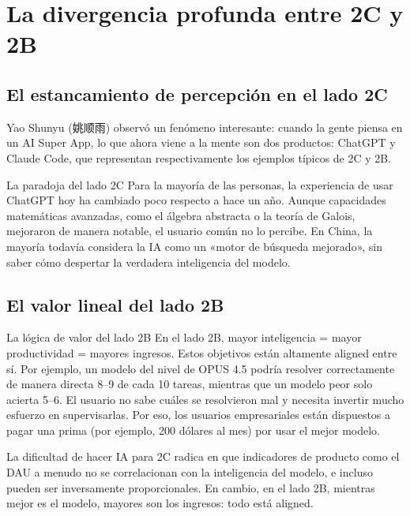 \documentclass[a4paper]{article}
\begin{document}
\section{La divergencia profunda entre 2C y 2B}

\subsection{El estancamiento de percepción en el lado 2C}

Yao Shunyu (姚顺雨) observó un fenómeno interesante: cuando la gente piensa en un AI Super App, lo que ahora viene a la mente son dos productos: ChatGPT y Claude Code, que representan respectivamente los ejemplos típicos de 2C y 2B.

\begin{warningbox}{La paradoja del lado 2C}
Para la mayoría de las personas, la experiencia de usar ChatGPT hoy ha cambiado poco respecto a hace un año. Aunque capacidades matemáticas avanzadas, como el álgebra abstracta o la teoría de Galois, mejoraron de manera notable, el usuario común no lo percibe. En China, la mayoría todavía considera la IA como un «motor de búsqueda mejorado», sin saber cómo despertar la verdadera inteligencia del modelo.
\end{warningbox}

\subsection{El valor lineal del lado 2B}

\begin{importantbox}{La lógica de valor del lado 2B}
En el lado 2B, mayor inteligencia = mayor productividad = mayores ingresos. Estos objetivos están altamente aligned entre sí. Por ejemplo, un modelo del nivel de OPUS 4.5 podría resolver correctamente de manera directa 8--9 de cada 10 tareas, mientras que un modelo peor solo acierta 5--6. El usuario no sabe cuáles se resolvieron mal y necesita invertir mucho esfuerzo en supervisarlas. Por eso, los usuarios empresariales están dispuestos a pagar una prima (por ejemplo, 200 dólares al mes) por usar el mejor modelo.
\end{importantbox}

La dificultad de hacer IA para 2C radica en que indicadores de producto como el DAU a menudo no se correlacionan con la inteligencia del modelo, e incluso pueden ser inversamente proporcionales. En cambio, en el lado 2B, mientras mejor es el modelo, mayores son los ingresos: todo está aligned.
\end{document}
